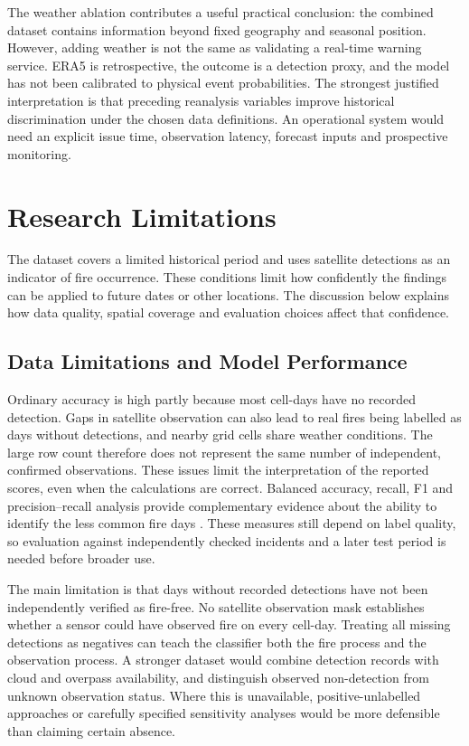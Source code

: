 \documentclass[conference,a4paper]{IEEEtran}
\begin{document}
The weather ablation contributes a useful practical conclusion: the combined dataset contains information beyond fixed geography and seasonal position. However, adding weather is not the same as validating a real-time warning service. ERA5 is retrospective, the outcome is a detection proxy, and the model has not been calibrated to physical event probabilities. The strongest justified interpretation is that preceding reanalysis variables improve historical discrimination under the chosen data definitions. An operational system would need an explicit issue time, observation latency, forecast inputs and prospective monitoring.

\section{Research Limitations}
The dataset covers a limited historical period and uses satellite detections as an indicator of fire occurrence. These conditions limit how confidently the findings can be applied to future dates or other locations. The discussion below explains how data quality, spatial coverage and evaluation choices affect that confidence.

\subsection{Data Limitations and Model Performance}
Ordinary accuracy is high partly because most cell-days have no recorded detection. Gaps in satellite observation can also lead to real fires being labelled as days without detections, and nearby grid cells share weather conditions. The large row count therefore does not represent the same number of independent, confirmed observations. These issues limit the interpretation of the reported scores, even when the calculations are correct. Balanced accuracy, recall, F1 and precision--recall analysis provide complementary evidence about the ability to identify the less common fire days \citep{saito}. These measures still depend on label quality, so evaluation against independently checked incidents and a later test period is needed before broader use.

The main limitation is that days without recorded detections have not been independently verified as fire-free. No satellite observation mask establishes whether a sensor could have observed fire on every cell-day. Treating all missing detections as negatives can teach the classifier both the fire process and the observation process. A stronger dataset would combine detection records with cloud and overpass availability, and distinguish observed non-detection from unknown observation status. Where this is unavailable, positive-unlabelled approaches or carefully specified sensitivity analyses would be more defensible than claiming certain absence.
\end{document}
